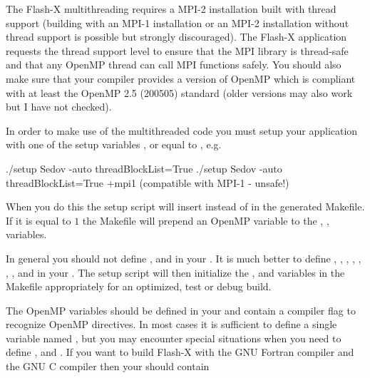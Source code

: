 The Flash-X multithreading requires a MPI-2 installation built with
thread support (building with an MPI-1 installation or an MPI-2
installation without thread support is possible but strongly
discouraged).  The Flash-X application requests the thread support level
 to ensure that the MPI library is
thread-safe and that any OpenMP thread can call MPI functions safely.
You should also make sure that your compiler provides a version of
OpenMP which is compliant with at least the OpenMP 2.5 (200505)
standard (older versions may also work but I have not checked).

In order to make use of the multithreaded code you must setup your
application with one of the setup variables ,
 or  equal to
, e.g.

\begin{codeseg}
./setup Sedov -auto threadBlockList=True
./setup Sedov -auto threadBlockList=True +mpi1 (compatible with MPI-1 - unsafe!)
\end{codeseg}


When you do this the setup script will insert 
instead of  in the generated Makefile.  If it is
equal to $1$ the Makefile will prepend an OpenMP variable to the
, ,  variables.


\begin{flashtip}
In general you should not define ,  and
 in your .  It is much better to define
, , ,
, , ,
,  and  in your
.  The setup script will then initialize the
,  and  variables in the
Makefile appropriately for an optimized, test or debug build.
\end{flashtip}

The OpenMP variables should be defined in your  and
contain a compiler flag to recognize OpenMP directives.  In most cases
it is sufficient to define a single variable named , but
you may encounter special situations when you need to define
,  and .  If you
want to build Flash-X with the GNU Fortran compiler  and
the GNU C compiler  then your  should
contain

